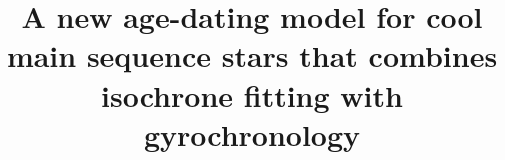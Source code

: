 \documentclass[useAMS, usenatbib, preprint, 12pt]{aastex}
\newcommand{\columbia}{3}
\newcommand{\cca}{2}
\newcommand{\amnh}{1}
\begin{document}
\title{A new age-dating model for cool main sequence stars that combines
isochrone fitting with gyrochronology}




\begin{abstract}
    
\end{abstract}





\end{document}
